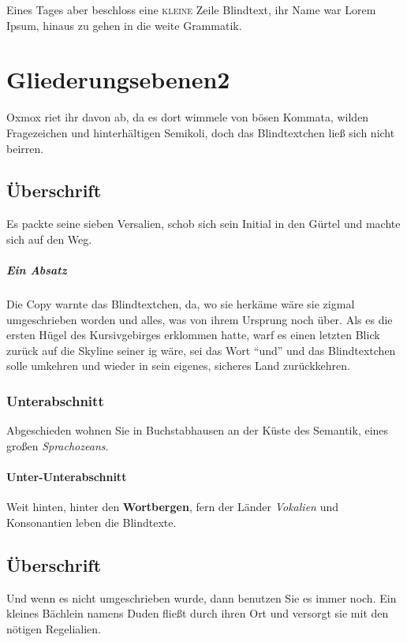 \documentclass[%
	12pt,%
	a4paper,%
	oneside,%
	liststotoc, idxtotoc, bibtotoc, %
	parskip=half,%
	nochapterprefix,%
	appendixprefix, %
	headings=small,%
]{scrreprt}
\begin{document}
Eines Tages aber beschloss eine \textsc{kleine} Zeile Blindtext, ihr Name war Lorem Ipsum, hinaus zu gehen in die weite Grammatik.

\chapter{Gliederungsebenen2}
\label{sec:Gliederung2}

Oxmox riet ihr davon ab, da es dort wimmele von bösen Kommata, wilden Fragezeichen und hinterhältigen Semikoli, doch das Blindtextchen ließ sich nicht beirren. 

\section{Überschrift}

Es packte seine sieben Versalien, schob sich sein Initial in den Gürtel und machte sich auf den Weg. 

\paragraph{Ein Absatz}
Die Copy warnte das Blindtextchen, da, wo sie herkäme wäre sie zigmal umgeschrieben worden und alles, was von ihrem Ursprung noch über. Als es die ersten Hügel des Kursivgebirges erklommen hatte, warf es einen letzten Blick zurück auf die Skyline seiner ig wäre, sei das Wort "`und"'  und das Blindtextchen solle umkehren und wieder in sein eigenes, sicheres Land zurückkehren.

\subsection{Unterabschnitt}
Abgeschieden wohnen Sie in Buchstabhausen an der Küste des Semantik, eines großen \textsl{Sprachozeans}.

\subsubsection{Unter-Unterabschnitt}
Weit hinten, hinter den \textbf{Wortbergen}, fern der Länder \textit{Vokalien} und Konsonantien leben die Blindtexte.

\section{Überschrift}
Und wenn es nicht umgeschrieben wurde, dann benutzen Sie es immer noch. Ein kleines Bächlein namens Duden fließt durch ihren Ort und versorgt sie mit den nötigen Regelialien. %
\end{document}
